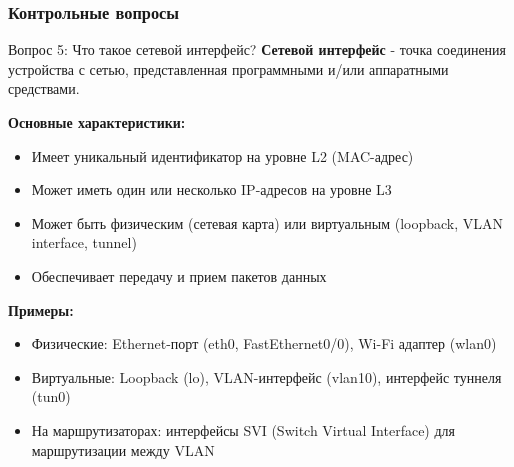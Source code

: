 \begin{frame}
\frametitle{Контрольные вопросы}
\begin{block}{Вопрос 5: Что такое сетевой интерфейс?}
\textbf{Сетевой интерфейс} - точка соединения устройства с сетью, представленная программными и/или аппаратными средствами.
\vspace{0.2cm}

\textbf{Основные характеристики:}
\begin{itemize}
    \item Имеет уникальный идентификатор на уровне L2 (MAC-адрес)
    \item Может иметь один или несколько IP-адресов на уровне L3
    \item Может быть физическим (сетевая карта) или виртуальным (loopback, VLAN interface, tunnel)
    \item Обеспечивает передачу и прием пакетов данных
\end{itemize}

\textbf{Примеры:}
\begin{itemize}
    \item Физические: Ethernet-порт (eth0, FastEthernet0/0), Wi-Fi адаптер (wlan0)
    \item Виртуальные: Loopback (lo), VLAN-интерфейс (vlan10), интерфейс туннеля (tun0)
    \item На маршрутизаторах: интерфейсы SVI (Switch Virtual Interface) для маршрутизации между VLAN
\end{itemize}
\end{block}
\end{frame}


